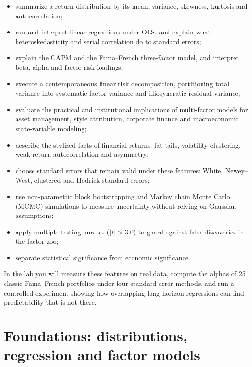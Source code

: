 \begin{itemize}
  \item summarize a return distribution by its mean, variance, skewness, kurtosis and autocorrelation;
  \item run and interpret linear regressions under OLS, and explain what heteroskedasticity and serial correlation do to standard errors;
  \item explain the CAPM and the Fama--French three-factor model, and interpret beta, alpha and factor risk loadings;
  \item execute a contemporaneous linear risk decomposition, partitioning total variance into systematic factor variance and idiosyncratic residual variance;
  \item evaluate the practical and institutional implications of multi-factor models for asset management, style attribution, corporate finance and macroeconomic state-variable modeling;
  \item describe the stylized facts of financial returns: fat tails, volatility clustering, weak return autocorrelation and asymmetry;
  \item choose standard errors that remain valid under these features: White, Newey--West, clustered and Hodrick standard errors;
  \item use non-parametric block bootstrapping and Markov chain Monte Carlo (MCMC) simulations to measure uncertainty without relying on Gaussian assumptions;
  \item apply multiple-testing hurdles ($|t| > 3.0$) to guard against false discoveries in the factor zoo;
  \item separate statistical significance from economic significance.
\end{itemize}

In the lab you will measure these features on real data, compute the alphas of 25 classic Fama--French portfolios under four standard-error methods, and run a controlled experiment showing how overlapping long-horizon regressions can find predictability that is not there.

\section{Foundations: distributions, regression and factor models}
\label{sec:03-foundations}

